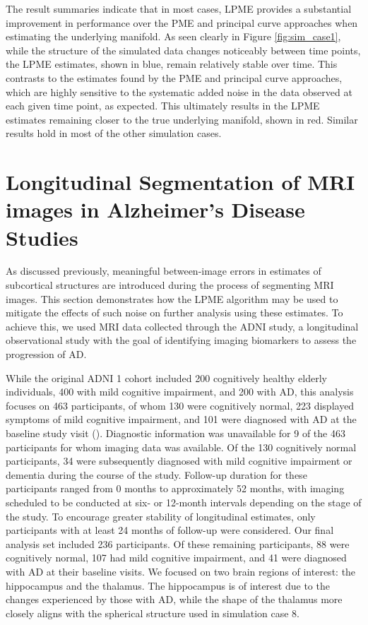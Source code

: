 \documentclass[11pt,reqno]{article}
\theoremstyle{definition}
\begin{document}
The result summaries indicate that in most cases, LPME provides a substantial improvement in performance over the PME and principal curve approaches when estimating the underlying manifold. As seen clearly in Figure \ref{fig:sim_case1}, while the structure of the simulated data changes noticeably between time points, the LPME estimates, shown in blue, remain relatively stable over time. This contrasts to the estimates found by the PME and principal curve approaches, which are highly sensitive to the systematic added noise in the data observed at each given time point, as expected. This ultimately results in the LPME estimates remaining closer to the true underlying manifold, shown in red. Similar results hold in most of the other simulation cases.



\section{Longitudinal Segmentation of MRI images in Alzheimer's Disease Studies}\label{s:application}

As discussed previously, meaningful between-image errors in estimates of subcortical structures are introduced during the process of segmenting MRI images. This section demonstrates how the LPME algorithm may be used to mitigate the effects of such noise on further analysis using these estimates. To achieve this, we used MRI data collected through the ADNI study, a longitudinal observational study with the goal of identifying imaging biomarkers to assess the progression of AD.

While the original ADNI 1 cohort included 200 cognitively healthy elderly individuals, 400 with mild cognitive impairment, and 200 with AD, this analysis focuses on 463 participants, of whom 130 were cognitively normal, 223 displayed symptoms of mild cognitive impairment, and 101 were diagnosed with AD at the baseline study visit (\cite{jack2008adni}). Diagnostic information was unavailable for 9 of the 463 participants for whom imaging data was available. Of the 130 cognitively normal participants, 34 were subsequently diagnosed with mild cognitive impairment or dementia during the course of the study. Follow-up duration for these participants ranged from 0 months to approximately 52 months, with imaging scheduled to be conducted at six- or 12-month intervals depending on the stage of the study. To encourage greater stability of longitudinal estimates, only participants with at least 24 months of follow-up were considered. Our final analysis set included 236 participants. Of these remaining participants, 88 were cognitively normal, 107 had mild cognitive impairment, and 41 were diagnosed with AD at their baseline visits. We focused on two brain regions of interest: the hippocampus and the thalamus. The hippocampus is of interest due to the changes experienced by those with AD, while the shape of the thalamus more closely aligns with the spherical structure used in simulation case 8.
\end{document}
